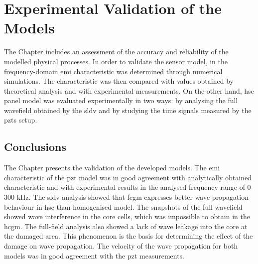
\chapter{Experimental Validation of the Models}
\label{ch:validation}

The Chapter includes an assessment of the accuracy and reliability of the modelled physical processes.
In order to validate the sensor model, in the frequency-domain \ac{emi} characteristic was determined through numerical simulations.
The characteristic was then compared with values obtained by theoretical analysis and with experimental measurements.
On the other hand, \ac{hsc} panel model was evaluated experimentally in two ways: by analysing the full wavefield obtained by the \ac{sldv} and by studying the time signals measured by the \acp{pzt} setup.





\section{Conclusions}
\label{sec:conclusionsValid}

The Chapter presents the validation of the developed models.
The \ac{emi} characteristic of the \ac{pzt} model was in good agreement with analytically obtained characteristic and with experimental results in the analysed frequency range of 0-300 \unit{\kHz}.
The \ac{sldv} analysis showed that \ac{fcgm} expresses better wave propagation behaviour in \ac{hsc} than homogenised model.
The snapshots of the full wavefield showed wave interference in the core cells, which was impossible to obtain in the \ac{hcgm}.
The full-field analysis also showed a lack of wave leakage into the core at the damaged area.
This phenomenon is the basis for determining the effect of the damage on wave propagation.
The velocity of the wave propagation for both models was in good agreement with the \ac{pzt} measurements.